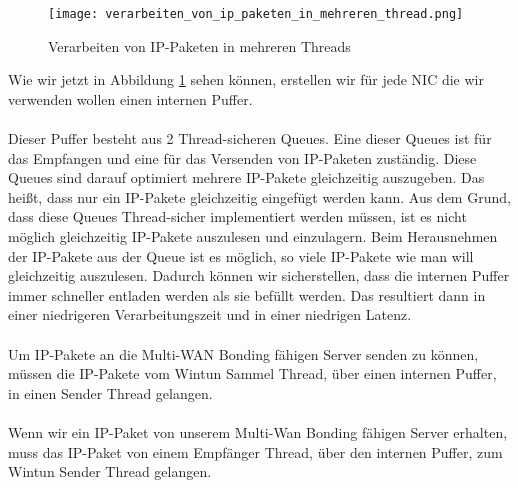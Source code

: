 \begin{figure}[H]
    \centering
    \texttt{[image: verarbeiten\_von\_ip\_paketen\_in\_mehreren\_thread.png]}
    \caption[Verarbeiten von IP-Paketen in mehreren Threads]{Verarbeiten von IP-Paketen in mehreren Threads}
    \label{driver-process-pakets-many-threads}
\end{figure}
\noindent
Wie wir jetzt in Abbildung \ref{driver-process-pakets-many-threads} sehen können, erstellen wir für jede NIC die wir verwenden wollen einen internen Puffer.
\\\\
Dieser Puffer besteht aus 2 Thread-sicheren Queues. Eine dieser Queues ist für das Empfangen und eine für das Versenden von IP-Paketen zuständig. Diese Queues sind darauf optimiert mehrere IP-Pakete gleichzeitig auszugeben. Das heißt, dass nur ein IP-Pakete gleichzeitig eingefügt werden kann. Aus dem Grund, dass diese Queues Thread-sicher implementiert werden müssen, ist es nicht möglich gleichzeitig IP-Pakete auszulesen und einzulagern. Beim Herausnehmen der IP-Pakete aus der Queue ist es möglich, so viele IP-Pakete wie man will gleichzeitig auszulesen. Dadurch können wir sicherstellen, dass die internen Puffer immer schneller entladen werden als sie befüllt werden. Das resultiert dann in einer niedrigeren Verarbeitungszeit und in einer niedrigen Latenz.
\\\\
Um IP-Pakete an die Multi-WAN Bonding fähigen Server senden zu können, müssen die IP-Pakete vom Wintun Sammel Thread, über einen internen Puffer, in einen Sender Thread gelangen. 
\\\\
Wenn wir ein IP-Paket von unserem Multi-Wan Bonding fähigen Server erhalten, muss das IP-Paket von einem Empfänger Thread, über den internen Puffer, zum Wintun Sender Thread gelangen.


